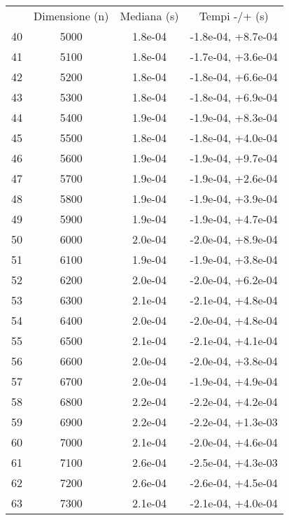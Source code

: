 \begin{table}
\centering
\begin{adjustbox}{width=1\textwidth/2}
\begin{tabular}{|c|c|c|c|}
\hline
 & Dimensione (n) & Mediana (s) & Tempi -/+ (s) \\
40 & 5000 & 1.8e-04 & -1.8e-04, +8.7e-04 \\
\cline{1-4}
41 & 5100 & 1.8e-04 & -1.7e-04, +3.6e-04 \\
\cline{1-4}
42 & 5200 & 1.8e-04 & -1.8e-04, +6.6e-04 \\
\cline{1-4}
43 & 5300 & 1.8e-04 & -1.8e-04, +6.9e-04 \\
\cline{1-4}
44 & 5400 & 1.9e-04 & -1.9e-04, +8.3e-04 \\
\cline{1-4}
45 & 5500 & 1.8e-04 & -1.8e-04, +4.0e-04 \\
\cline{1-4}
46 & 5600 & 1.9e-04 & -1.9e-04, +9.7e-04 \\
\cline{1-4}
47 & 5700 & 1.9e-04 & -1.9e-04, +2.6e-04 \\
\cline{1-4}
48 & 5800 & 1.9e-04 & -1.9e-04, +3.9e-04 \\
\cline{1-4}
49 & 5900 & 1.9e-04 & -1.9e-04, +4.7e-04 \\
\cline{1-4}
50 & 6000 & 2.0e-04 & -2.0e-04, +8.9e-04 \\
\cline{1-4}
51 & 6100 & 1.9e-04 & -1.9e-04, +3.8e-04 \\
\cline{1-4}
52 & 6200 & 2.0e-04 & -2.0e-04, +6.2e-04 \\
\cline{1-4}
53 & 6300 & 2.1e-04 & -2.1e-04, +4.8e-04 \\
\cline{1-4}
54 & 6400 & 2.0e-04 & -2.0e-04, +4.8e-04 \\
\cline{1-4}
55 & 6500 & 2.1e-04 & -2.1e-04, +4.1e-04 \\
\cline{1-4}
56 & 6600 & 2.0e-04 & -2.0e-04, +3.8e-04 \\
\cline{1-4}
57 & 6700 & 2.0e-04 & -1.9e-04, +4.9e-04 \\
\cline{1-4}
58 & 6800 & 2.2e-04 & -2.2e-04, +4.2e-04 \\
\cline{1-4}
59 & 6900 & 2.2e-04 & -2.2e-04, +1.3e-03 \\
\cline{1-4}
60 & 7000 & 2.1e-04 & -2.0e-04, +4.6e-04 \\
\cline{1-4}
61 & 7100 & 2.6e-04 & -2.5e-04, +4.3e-03 \\
\cline{1-4}
62 & 7200 & 2.6e-04 & -2.6e-04, +4.5e-04 \\
\cline{1-4}
63 & 7300 & 2.1e-04 & -2.1e-04, +4.0e-04 \\

\end{tabular}
\end{adjustbox}
\end{table}
